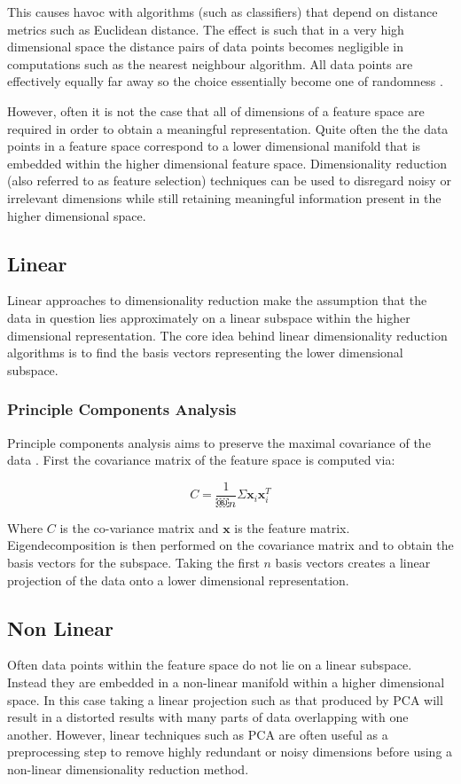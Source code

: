 This causes havoc with algorithms (such as classifiers) that depend on distance metrics such as Euclidean distance. The effect is such that in a very high dimensional space the distance pairs of data points becomes negligible in computations such as the nearest neighbour algorithm. All data points are effectively equally far away so the choice essentially become one of randomness \cite{domingos2012few}. 

However, often it is not the case that all of dimensions of a feature space are required in order to obtain a meaningful representation. Quite often the the data points in a feature space correspond to a lower dimensional manifold that is embedded within the higher dimensional feature space. Dimensionality reduction (also referred to as feature selection) techniques can be used to disregard noisy or irrelevant dimensions while still retaining meaningful information present in the higher dimensional space.

\subsection{Linear}
Linear approaches to dimensionality reduction make the assumption that the data in question lies approximately on a linear subspace within the higher dimensional representation. The core idea behind linear dimensionality reduction algorithms is to find the basis vectors representing the lower dimensional subspace.

\subsubsection{Principle Components Analysis}
Principle components analysis aims to preserve the maximal covariance of the data \cite{strange2014open}. First the covariance matrix of the feature space is computed via:

\begin{equation}
	C = \frac{1}{￼n}\Sigma \mathbf{x}_i \mathbf{x}_i^T
\end{equation}

Where $C$ is the co-variance matrix and $\mathbf{x}$ is the feature matrix. Eigendecomposition is then performed on the covariance matrix and to obtain the basis vectors for the subspace. Taking the first $n$ basis vectors creates a linear projection of the data onto a lower dimensional representation.

\subsection{Non Linear}
Often data points within the feature space do not lie on a linear subspace. Instead they are embedded in a non-linear manifold within a higher dimensional space. In this case taking a linear projection such as that produced by PCA will result in a distorted results with many parts of data overlapping with one another. However, linear techniques such as PCA are often useful as a preprocessing step to remove highly redundant or noisy dimensions before using a non-linear dimensionality reduction method.

